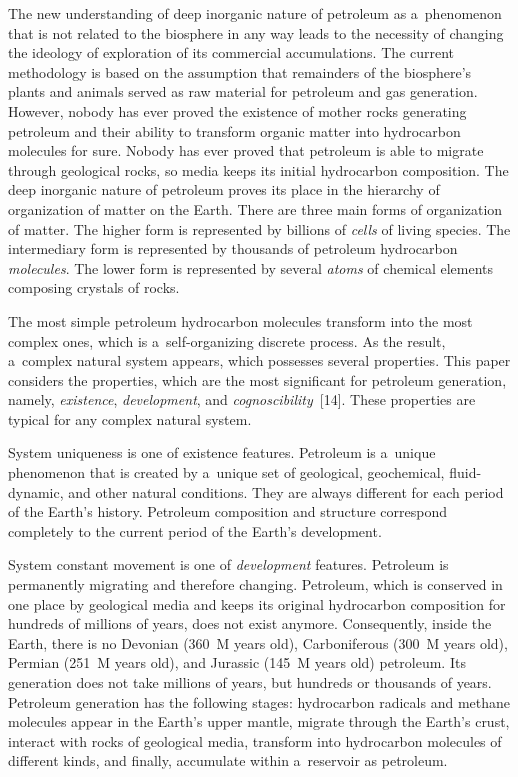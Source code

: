 \begin{multicols}{2}
The new understanding of deep inorganic nature of petroleum as a~phenomenon 
that is not related to the biosphere in any way leads to the necessity of changing the 
ideology of exploration of its commercial accumulations. The current methodology 
is based on the assumption that remainders of the biosphere's plants and animals 
served as raw material for petroleum and gas generation. However, nobody has 
ever proved the existence of mother rocks generating petroleum and their ability to 
transform organic matter into hydrocarbon molecules for sure. Nobody has ever 
proved that petroleum is able to migrate through geological rocks, so media keeps 
its initial hydrocarbon composition. The deep inorganic nature of petroleum proves 
its place in the hierarchy of organization of matter on the Earth. There are three 
main forms of organization of matter. The higher form is represented by billions of 
\textit{cells} of living species. The intermediary form is represented by thousands 
of petroleum hydrocarbon \textit{molecules}. The lower form is represented by 
several \textit{atoms} of chemical elements composing crystals of rocks. 

The most simple petroleum hydrocarbon molecules transform into the most 
complex ones, which is a~self-organizing discrete process. As the result, a~complex 
natural system appears, which possesses several properties. This paper considers 
the properties, which are the most significant for petroleum generation, namely, 
\textit{existence}, \textit{development}, and \textit{cognoscibility}~[14]. These 
properties are typical for any complex natural system.

System uniqueness is one of existence features. Petroleum is a~unique phenomenon 
that is created by a~unique set of geological, geochemical, fluid-dynamic, and other 
natural conditions. They are always different for each period of the Earth's history. 
Petroleum composition and structure correspond completely to the current period 
of the Earth's development. 
     
     System constant movement is one of \textit{development} features. 
Petroleum is permanently migrating and therefore changing. Petroleum, which is 
conserved in one place by geological media and keeps its original hydrocarbon 
composition for hundreds of millions of years, does not exist anymore. 
Consequently, inside the Earth, there is no Devonian (360~M years old), 
Carboniferous (300~M years old), Permian (251~M years old), and Jurassic 
(145~M years old) petroleum. Its generation does not take millions of years, but 
hundreds or thousands of years. Petroleum generation has the following stages: 
hydrocarbon radicals and methane molecules appear in the Earth's upper mantle, 
migrate through the Earth's crust, interact with rocks of geological media, 
transform into hydrocarbon molecules of different kinds, and finally, accumulate 
within a~reservoir as petroleum.
{

}
\end{multicols}
